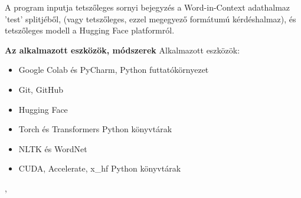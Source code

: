 \documentclass[12pt]{report}
\theoremstyle{definition}
\begin{document}
    A program inputja tetszőleges sornyi bejegyzés a Word-in-Context adathalmaz 'test' splitjéből, (vagy tetszőleges, ezzel megegyező formátumú kérdéshalmaz), és tetszőleges modell a Hugging Face platformról.


 \textbf{Az alkalmazott eszközök, módszerek}
        Alkalmazott eszközök:
      \begin{itemize}

        \item Google Colab és PyCharm, Python futtatókörnyezet
        \item Git, GitHub
        \item Hugging Face
        \item Torch és Transformers Python könyvtárak
        \item NLTK és WordNet
        \item CUDA, Accelerate, x\_hf Python könyvtárak

      \end{itemize},
\end{document}
